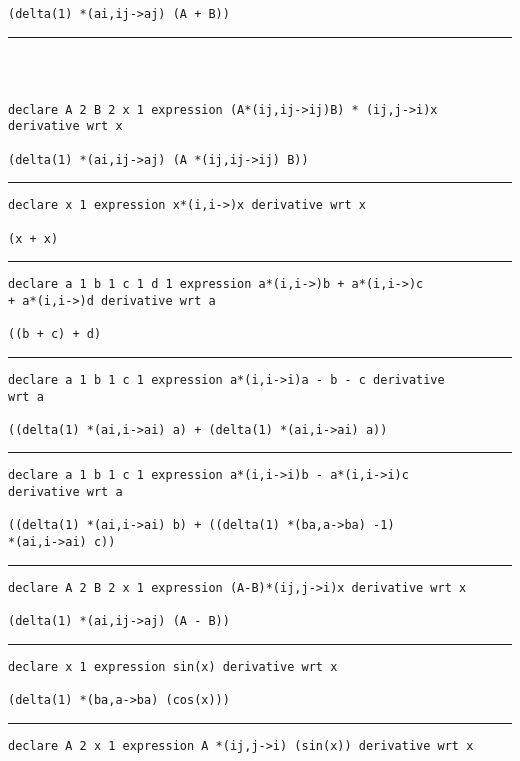 \documentclass[12pt, a4paper]{report} %
\begin{document}
\begin{multicols}{2}
\begin{verbatim}
(delta(1) *(ai,ij->aj) (A + B))
\end{verbatim}
\vspace{-20pt} \rule[-10pt]{\columnwidth}{0.1pt} 
\begin{verbatim}



declare A 2 B 2 x 1 expression (A*(ij,ij->ij)B) * (ij,j->i)x 
derivative wrt x

(delta(1) *(ai,ij->aj) (A *(ij,ij->ij) B))
\end{verbatim}
\vspace{-20pt} \rule[-10pt]{\columnwidth}{0.1pt} 
\begin{verbatim}
declare x 1 expression x*(i,i->)x derivative wrt x

(x + x)
\end{verbatim}
\vspace{-20pt} \rule[-10pt]{\columnwidth}{0.1pt} 
\begin{verbatim}
declare a 1 b 1 c 1 d 1 expression a*(i,i->)b + a*(i,i->)c 
+ a*(i,i->)d derivative wrt a

((b + c) + d)
\end{verbatim}
\vspace{-20pt} \rule[-10pt]{\columnwidth}{0.1pt} 
\begin{verbatim}
declare a 1 b 1 c 1 expression a*(i,i->i)a - b - c derivative 
wrt a

((delta(1) *(ai,i->ai) a) + (delta(1) *(ai,i->ai) a))
\end{verbatim}
\vspace{-20pt} \rule[-10pt]{\columnwidth}{0.1pt} 
\begin{verbatim}
declare a 1 b 1 c 1 expression a*(i,i->i)b - a*(i,i->i)c 
derivative wrt a

((delta(1) *(ai,i->ai) b) + ((delta(1) *(ba,a->ba) -1) 
*(ai,i->ai) c))
\end{verbatim}
\vspace{-20pt} \rule[-10pt]{\columnwidth}{0.1pt} 
\begin{verbatim}
declare A 2 B 2 x 1 expression (A-B)*(ij,j->i)x derivative wrt x

(delta(1) *(ai,ij->aj) (A - B))
\end{verbatim}
\vspace{-20pt} \rule[-10pt]{\columnwidth}{0.1pt} 
\begin{verbatim}
declare x 1 expression sin(x) derivative wrt x

(delta(1) *(ba,a->ba) (cos(x)))
\end{verbatim}
\vspace{-20pt} \rule[-10pt]{\columnwidth}{0.1pt} 
\begin{verbatim}
declare A 2 x 1 expression A *(ij,j->i) (sin(x)) derivative wrt x


\end{verbatim}
\end{multicols}
\end{document}

